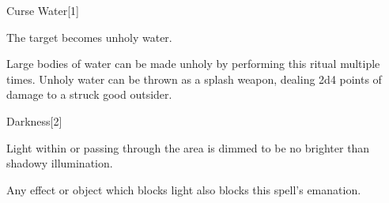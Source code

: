 \begin{spellsection}{Curse Water}[1]
    \begin{spellheader}
    \end{spellheader}
    \begin{spellcontent}
        \begin{spelltargetinginfo}
        \end{spelltargetinginfo}
        \begin{spelleffects}
            \spelleffect The target becomes unholy water.
        \end{spelleffects}
    \end{spellcontent}
    \begin{spellfooter}
        \spellnotes Large bodies of water can be made unholy by performing this ritual multiple times. Unholy water can be thrown as a splash weapon, dealing 2d4 points of damage to a struck good outsider.
    \end{spellfooter}
\end{spellsection}

\begin{spellsection}{Darkness}[2]
    \begin{spellheader}
    \end{spellheader}
    \begin{spellcontent}
        \begin{spelltargetinginfo}
        \end{spelltargetinginfo}
        \begin{spelleffects}
            \spelleffect Light within or passing through the area is dimmed to be no brighter than shadowy illumination.
            \spelldur \durlong \dismissable
        \end{spelleffects}
    \end{spellcontent}
    \begin{spellfooter}
        \spellnotes Any effect or object which blocks light also blocks this spell's emanation.
    \end{spellfooter}
    \begin{spellaugments}
    \end{spellaugments}
\end{spellsection}

